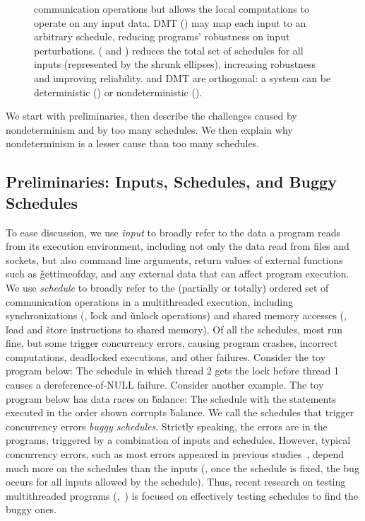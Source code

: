 \begin{figure}[t]
\begin{center}
{  communication operations but allows the local computations to operate on
  any input data.  DMT () may
  map each input to an arbitrary schedule, reducing programs' robustness
  on input perturbations.  \smt ( and
  ) reduces the total set of schedules for all inputs (represented by the shrunk ellipses),
  increasing robustness and improving reliability.
  \smt and DMT are orthogonal: a \smt system can be deterministic
  () or nondeterministic ().}
\vspace{-.2in}
\end{center}
\end{figure}

We start with preliminaries, then describe the challenges caused by
nondeterminism and by too many schedules.  We then explain why
nondeterminism is a lesser cause than too many schedules.

\subsection{Preliminaries: Inputs, Schedules, and Buggy Schedules}

To ease discussion, we use \emph{input} to broadly refer to the data a
program reads from its execution environment, including not only the data
read from files and sockets, but also command line arguments, return
values of external functions such as \v{gettimeofday}, and any external data that can affect program
execution.  We use \emph{schedule} to broadly refer to the (partially or
totally) ordered set of communication operations in a multithreaded
execution, including synchronizations (\eg, \v{lock} and
\v{unlock} operations) and shared memory accesses (\eg, \v{load} and
\v{store} instructions to shared memory). Of all the schedules, most run
fine, but some trigger concurrency errors, causing program crashes,
incorrect computations, deadlocked executions, and other failures.
Consider the toy program below: 
\noindent The schedule in which thread 2 gets the lock before thread 1
causes a dereference-of-NULL failure.  Consider another example.  The toy program
below has data races on \v{balance}: 
\noindent 
The schedule with the statements executed in the order shown corrupts
\v{balance}. We call the schedules that trigger concurrency errors
\emph{buggy schedules}.  Strictly speaking, the errors are in the
programs, triggered by a combination of inputs and schedules.  However,
typical concurrency errors, such as most errors appeared in previous
studies~\cite{lu:concurrency-bugs,con:hotpar12}, depend much more on the
schedules than the inputs (\eg, once the schedule is fixed, the bug
occurs for all inputs allowed by the schedule).  Thus, recent research on
testing multithreaded programs (\eg,~\cite{musuvathi:chess:osdi08}) is
focused on effectively testing schedules to find the buggy ones.

